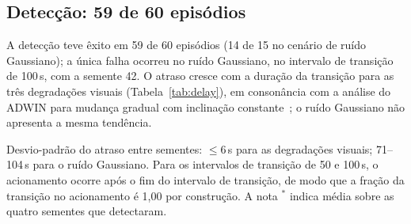 \documentclass[conference]{IEEEtran}
\begin{document}
\subsection{Detecção: 59 de 60 episódios}
A detecção teve êxito em 59 de 60 episódios (14 de 15 no cenário de ruído Gaussiano); a única falha ocorreu no ruído Gaussiano, no intervalo de transição de 100\,s, com a semente 42. O atraso cresce com a duração da transição para as três degradações visuais (Tabela~\ref{tab:delay}), em consonância com a análise do ADWIN para mudança gradual com inclinação constante~\cite{bifet2007}; o ruído Gaussiano não apresenta a mesma tendência.

\begin{table}[!t]
\centering
\caption{Atraso de detecção (s) e a fração da transição no acionamento (médias por grupo sobre 5 sementes; taxa de detecção por grupo; a semente Gaussiana que falhou em 100\,s está excluída da média de atraso desse grupo).}
\label{tab:delay}
\small
{}
\vspace{2pt}
{\footnotesize Desvio-padrão do atraso entre sementes: $\le$6\,s para as degradações
visuais; 71--104\,s para o ruído Gaussiano. Para os intervalos de transição de 50 e 100\,s, o
acionamento ocorre após o fim do intervalo de transição, de modo que a fração da transição no
acionamento é 1,00 por construção. A nota $^{*}$ indica média sobre as quatro sementes que detectaram.}
\end{table}
\end{document}
